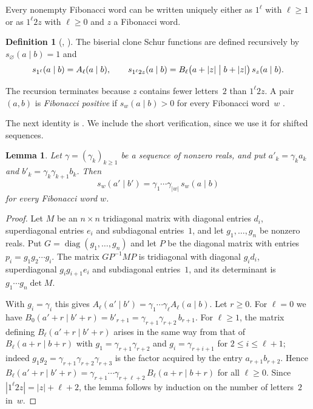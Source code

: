 \documentclass[11pt]{amsart}
\newtheorem{lemma}[theorem]{Lemma}
\theoremstyle{definition}
\newtheorem{definition}[theorem]{Definition}
\theoremstyle{remark}
\numberwithin{equation}{section}
\begin{document}
Every nonempty Fibonacci word can be written uniquely either as $1^\ell$ with $\ell\ge1$ or as $1^\ell2z$ with $\ell\ge0$ and $z$ a Fibonacci word.

\begin{definition}[{\cite{Oka94}, \cite[Definition~2.5]{PS26}}]\label{def:clone}
The biserial clone Schur functions are defined recursively by $s_\varnothing(a\mid b)=1$ and
\[
s_{1^\ell}(a\mid b)=A_\ell(a\mid b),\qquad
s_{1^\ell2z}(a\mid b)=B_\ell\bigl(a+|z|\bigm| b+|z|\bigr)\,s_z(a\mid b).
\]
\end{definition}

The recursion terminates because $z$ contains fewer letters~$2$ than $1^\ell2z$. A pair $(a,b)$ is \emph{Fibonacci positive} if $s_w(a\mid b)>0$ for every Fibonacci word~$w$ \cite[Definition~4.1]{PS26}.

The next identity is \cite[(2.13)]{PS26}. We include the short verification, since we use it for shifted sequences.

\begin{lemma}\label{lem:rescale}
Let $\gamma=(\gamma_k)_{k\ge1}$ be a sequence of nonzero reals, and put $a'_k=\gamma_ka_k$ and $b'_k=\gamma_k\gamma_{k+1}b_k$. Then
\[
s_w(a'\mid b')=\gamma_1\cdots\gamma_{|w|}\,s_w(a\mid b)
\]
for every Fibonacci word $w$.
\end{lemma}

\begin{proof}
Let $M$ be an $n\times n$ tridiagonal matrix with diagonal entries $d_i$, superdiagonal entries $e_i$ and subdiagonal entries~$1$, and let $g_1,\dots,g_n$ be nonzero reals. Put $G=\operatorname{diag}(g_1,\dots,g_n)$ and let $P$ be the diagonal matrix with entries $p_i=g_1g_2\cdots g_i$. The matrix $GP^{-1}MP$ is tridiagonal with diagonal $g_id_i$, superdiagonal $g_ig_{i+1}e_i$ and subdiagonal entries~$1$, and its determinant is $g_1\cdots g_n\det M$.

With $g_i=\gamma_i$ this gives $A_\ell(a'\mid b')=\gamma_1\cdots\gamma_\ell A_\ell(a\mid b)$. Let $r\ge0$. For $\ell=0$ we have $B_0(a'+r\mid b'+r)=b'_{r+1}=\gamma_{r+1}\gamma_{r+2}\,b_{r+1}$. For $\ell\ge1$, the matrix defining $B_\ell(a'+r\mid b'+r)$ arises in the same way from that of $B_\ell(a+r\mid b+r)$ with $g_1=\gamma_{r+1}\gamma_{r+2}$ and $g_i=\gamma_{r+i+1}$ for $2\le i\le\ell+1$; indeed $g_1g_2=\gamma_{r+1}\gamma_{r+2}\gamma_{r+3}$ is the factor acquired by the entry $a_{r+1}b_{r+2}$. Hence $B_\ell(a'+r\mid b'+r)=\gamma_{r+1}\cdots\gamma_{r+\ell+2}\,B_\ell(a+r\mid b+r)$ for all $\ell\ge0$. Since $|1^\ell2z|=|z|+\ell+2$, the lemma follows by induction on the number of letters~$2$ in~$w$.
\end{proof}
\end{document}
